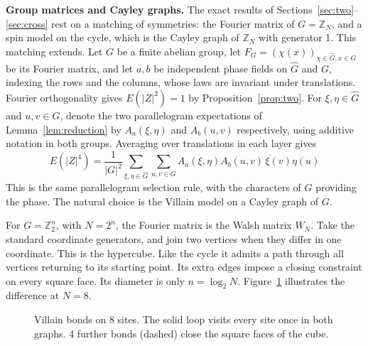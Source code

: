\documentclass[11pt,a4paper]{article}
\theoremstyle{remark}
\begin{document}
\noindent\textbf{Group matrices and Cayley graphs.} The exact results of Sections~\ref{sec:two}--\ref{sec:cross} rest on a matching of symmetries: the Fourier matrix of $G=\mathbb Z_N$, and a spin model on the cycle, which is the Cayley graph of $\mathbb Z_N$ with generator 1. This matching extends. Let $G$ be a finite abelian group, let $F_G=(\chi(x))_{\chi\in\widehat G,x\in G}$ be its Fourier matrix, and let $a,b$ be independent phase fields on $\widehat G$ and $G$, indexing the rows and the columns, whose laws are invariant under translations. Fourier orthogonality gives $E(|Z|^2)=1$ by Proposition~\ref{prop:two}. For $\xi,\eta\in\widehat G$ and $u,v\in G$, denote the two parallelogram expectations of Lemma~\ref{lem:reduction} by $A_a(\xi,\eta)$ and $A_b(u,v)$ respectively, using additive notation in both groups. Averaging over translations in each layer gives
\[
 E(|Z|^4)=\frac1{|G|^2}\sum_{\xi,\eta\in\widehat G}\sum_{u,v\in G}
 A_a(\xi,\eta)\overline{A_b(u,v)\,\xi(v)\eta(u)}
\]
This is the same parallelogram selection rule, with the characters of $G$ providing the phase. The natural choice is the Villain model on a Cayley graph of $G$.

For $G=\mathbb Z_2^n$, with $N=2^n$, the Fourier matrix is the Walsh matrix $W_N$. Take the standard coordinate generators, and join two vertices when they differ in one coordinate. This is the hypercube. Like the cycle it admits a path through all vertices returning to its starting point. Its extra edges impose a closing constraint on every square face. Its diameter is only $n=\log_2N$. Figure~\ref{fig:cayley} illustrates the difference at $N=8$.

\begin{figure}[H]
\centering
{}
\caption{Villain bonds on 8 sites. The solid loop visits every site
once in both graphs. 4 further bonds (dashed) close the square faces
of the cube.}\label{fig:cayley}
\end{figure}
\end{document}
